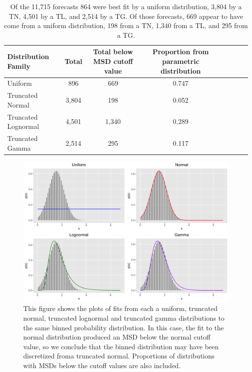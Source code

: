 \documentclass[11pt,notitlepage]{isuthesis}
\begin{document}
\begin{table}[h!]
  \centering
  \begin{tabular}{l*{6}{c}r}
  Distribution Family   & Total    & Total below MSD cutoff value 
  & Proportion from parametric distribution\\
  \hline
  Uniform               & 896      & 669  & 0.747  \\
  Truncated Normal      & 3,804    & 198  & 0.052  \\
  Truncated Lognormal   & 4,501    & 1,340 & 0.289 \\
  Truncated Gamma       & 2,514    & 295   & 0.117 \\
  \end{tabular}
  \begin{center}
\begin{minipage}{10cm}
\captionsetup{font=scriptsize}
  \caption[CDC flu retro analysis results]{Of the 11,715
forecasts 864 were best fit by a uniform distribution, 3,804 by a TN, 
4,501 by a TL, and 2,514 by a TG. Of those forecasts, 669 appear to have
come from a uniform distribution, 198 from a TN, 1,340 from a TL, and 295 from
a TG.
}
  \label{table:cdcresults}
  \end{minipage}
  \end{center}
\end{table}

\begin{figure}[htbp]
\centerline{\includegraphics[scale=.15]{Images/flu_fit_17_10_3.png}}
\caption[Parametric distribution fits to binned distribution]{This figure shows
the plots of fits from each a uniform, truncated normal, truncated lognormal
and truncated gamma distributions to the same binned probability distribution.
In this case, the fit to the normal distribution produced an MSD below the 
normal cutoff value, so we conclude that the binned distribution may have been
discretized froma truncated normal. Proportions of distributions with MSDs 
below the cutoff values are also included.}
\label{fig:binparamfits}
\end{figure}
\end{document}
